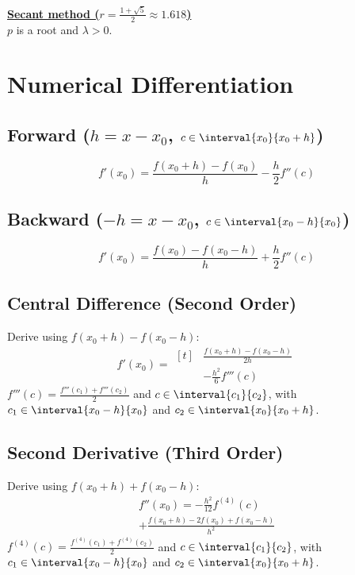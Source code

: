 \documentclass{article}
\begin{document}
\begin{minipage}[t]{62.39259259mm}
    \underline{\textbf{Secant method (\(r = \tfrac{1 + \sqrt{5}}{2} \approx 1.618\))}} \\
    \(p\) is a root and \(\lambda > 0\).
    \section{Numerical Differentiation}
    \subsection{Forward (\texorpdfstring{\(h = x - x_0\)}{h = x - x0}, \texorpdfstring{\(c \in \interval{x_0}{x_0 + h}\)}{c in [x0, x0 + h]})}
    \begin{equation*}
        f'\left( x_0 \right) = \frac{f\left( x_0 + h \right) - f\left( x_0 \right)}{h} - \frac{h}{2} f''\left( c \right)
    \end{equation*}
    \subsection{Backward (\texorpdfstring{\(-h = x - x_0\)}{-h = x - x0}, \texorpdfstring{\(c \in \interval{x_0 - h}{x_0}\)}{c in [x0 - h, x0]})}
    \begin{equation*}
        f'\left( x_0 \right) = \frac{f\left( x_0 \right) - f\left( x_0 - h \right)}{h} + \frac{h}{2} f''\left( c \right)
    \end{equation*}
    \subsection{Central Difference (Second Order)}
    Derive using \(f\left( x_0 + h \right) - f\left( x_0 - h \right)\):
    \begin{equation*}
        f'\left( x_0 \right) = \begin{aligned}[t]
             & \frac{f\left( x_0 + h \right) - f\left( x_0 - h \right)}{2h} \\
             & - \frac{h^2}{6} f'''\left( c \right)
        \end{aligned}
    \end{equation*}
    \(f'''\left( c \right) = \frac{f'''\left( c_1 \right) + f'''\left( c_2 \right)}{2}\) and \(c \in \interval{c_1}{c_2}\),
    with \(c_1 \in \interval{x_0 - h}{x_0}\) and \(c_2 \in \interval{x_0}{x_0 + h}\).
    \subsection{Second Derivative (Third Order)}
    Derive using \(f\left( x_0 + h \right) + f\left( x_0 - h \right)\):
    \begin{multline*}
        f''\left( x_0 \right) = - \frac{h^2}{12} f^{\left( 4 \right)}\left( c \right) \\
        + \frac{f\left( x_0 + h \right) - 2f\left( x_0 \right) + f\left( x_0 - h \right)}{h^2}
    \end{multline*}
    \(f^{\left( 4 \right)}\left( c \right) = \frac{f^{\left( 4 \right)}\left( c_1 \right) + f^{\left( 4 \right)}\left( c_2 \right)}{2}\) and \(c \in \interval{c_1}{c_2}\),
    with \(c_1 \in \interval{x_0 - h}{x_0}\) and \(c_2 \in \interval{x_0}{x_0 + h}\).

\end{minipage}
\end{document}

